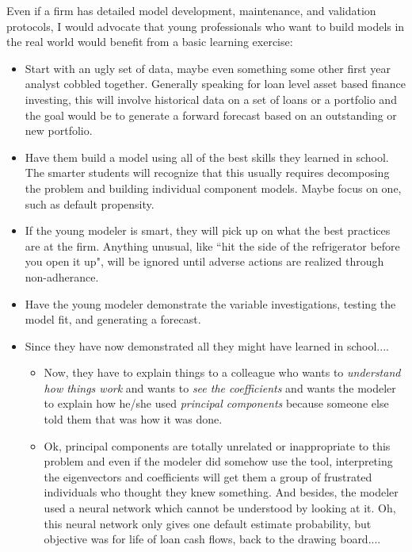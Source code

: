 \documentclass[10pt]{article}
\begin{document}
Even if a firm has detailed model development, maintenance, and validation protocols, 
I would advocate that young professionals who want to build models in
the real world would benefit from a basic learning exercise:
\begin{itemize}
    \item Start with an ugly set of data, maybe even something some other first year analyst 
        cobbled together.  Generally speaking for loan level asset based finance investing, 
        this will involve historical data on a set of loans or a portfolio and the 
        goal would be to generate a forward forecast based on an outstanding or new
        portfolio.
    \item Have them build a model using all of the best skills they learned in school. The smarter
        students will recognize that this usually requires decomposing the problem and building
        individual component models.  Maybe focus on one, such as default propensity.
    \item If the young modeler is smart, they will pick up on what the best practices are at the firm.
        Anything unusual, like ``hit the side of the refrigerator before you open it up", will be ignored
        until adverse actions are realized through non-adherance.
    \item Have the young modeler demonstrate the variable investigations, testing the model fit, and generating a forecast.
    \item Since they have now demonstrated all they might have learned in school....
        \begin{itemize}
            \item Now, they have to explain things to a colleague who wants to {\em understand 
                how things work} and wants to {\em see the coefficients} and wants the modeler to explain
                how he/she used {\em principal components} because someone else told them that was how it was done.
            \item Ok, principal components are totally unrelated or inappropriate to this problem and 
                even if the modeler did somehow use the tool, interpreting the eigenvectors and coefficients
                will get them a group of frustrated individuals who thought they knew something.
                And besides, the modeler used a neural network which cannot be understood by looking
                at it.  Oh, this neural network only gives one default estimate probability, but objective 
                was for life of loan cash flows, back to the drawing board....

\end{itemize}
\end{itemize}
\end{document}
